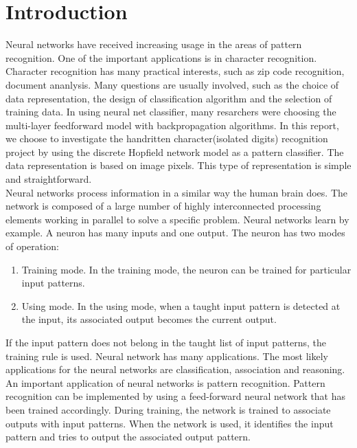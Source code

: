 \section{Introduction}
Neural networks have received increasing usage in the areas of pattern recognition. One of the important applications is in character recognition. Character recognition has many practical interests, such as zip code recognition, document ananlysis. Many questions are usually involved, such as the choice of data representation, the design of classification algorithm and the selection of training data. In using neural net classifier, many resarchers were choosing the multi-layer feedforward model with backpropagation algorithms. In this report, we choose to investigate the handritten character(isolated digits) recognition project by using the discrete Hopfield network model as a pattern classifier. The data representation is based on image pixels. This type of representation is simple and straightforward. \\

Neural networks process information in a similar way the human brain does. The network is composed of a large number of highly interconnected processing elements working in parallel to solve a specific problem. Neural networks learn by example. A neuron has many inputs and one output. The neuron has two modes of operation:
\begin{enumerate}[label=(\alph*)]
\item Training mode. In the training mode, the neuron can be trained for particular input patterns.
\item Using mode. In the using mode, when a taught input pattern is detected at the input, its associated output becomes the current output.
\end{enumerate} 
If the input pattern does not belong in the taught list of input patterns, the training rule is used. Neural network has many applications. The most likely applications for the neural networks are classification, association and reasoning. An important application of neural networks is pattern recognition. Pattern recognition can be implemented by using a feed-forward neural network that has been trained accordingly. During training, the network is trained to associate outputs with input patterns. When the network is used, it identifies the input pattern and tries to output the associated output pattern.